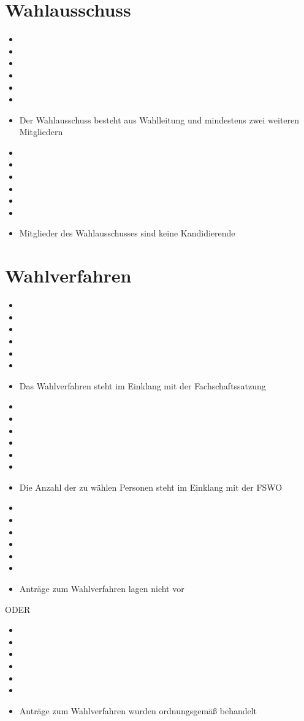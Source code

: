 \documentclass[a4paper]{scrartcl}
\newcommand{\fullcheck}{\raisebox{-.8\dp\strutbox}{\texttt{[image: Check.pdf]}}}
\newcommand{\semicheck}{\raisebox{-.8\dp\strutbox}{\texttt{[image: Semicheck.pdf]}}}
\newcommand{\nocheck}{\raisebox{-.8\dp\strutbox}{\texttt{[image: Nocheck.pdf]}}}
\newcommand{\dontknow}{\raisebox{-.8\dp\strutbox}{\texttt{[image: Dontknow.pdf]}}}
\newcommand{\notrev}{\raisebox{-.8\dp\strutbox}{\texttt{[image: Notrev.pdf]}}}
\newcommand{\sym}[1]{
\ifcase#1 \item[$\Box$]
\or \item[\fullcheck]
\or \item[\semicheck]
\or \item[\nocheck]
\or \item[\dontknow]
\or \item[\notrev]
\else \item[$\Box$]
\fi}
\begin{document}









\section{Wahlausschuss}
\begin{itemize}[label=$\Box$]
	\sym{0} Der Wahlausschuss besteht aus Wahlleitung und mindestens zwei weiteren Mitgliedern %
	\sym{0} Mitglieder des Wahlausschusses sind keine Kandidierende %
\end{itemize}

\section{Wahlverfahren}
\begin{itemize}[label=$\Box$]
	\sym{0} Das Wahlverfahren steht im Einklang mit der Fachschaftssatzung %
	\sym{0} Die Anzahl der zu wählen Personen steht im Einklang mit der FSWO %
	\sym{0} Anträge zum Wahlverfahren lagen nicht vor
\end{itemize}
ODER
\begin{itemize}[label=$\Box$]	
	\sym{0} Anträge zum Wahlverfahren wurden ordnungsgemäß behandelt %
\end{itemize}
\end{document}
